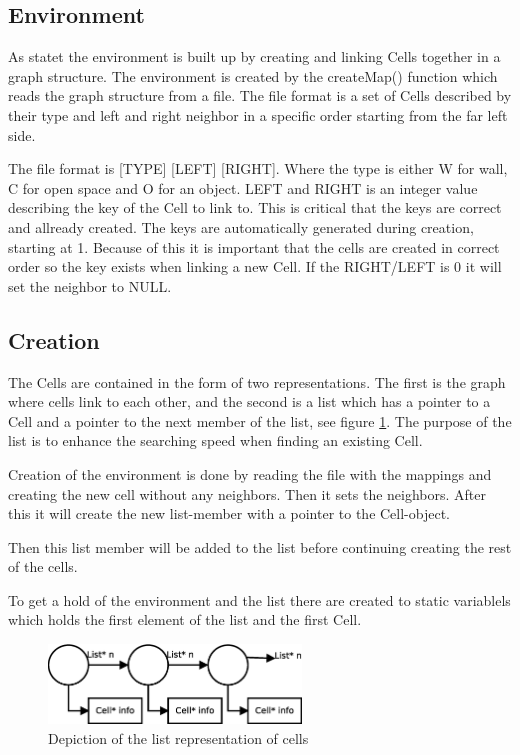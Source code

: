 \subsection{Environment}

As statet the environment is built up by creating and linking Cells together in
a graph structure. The environment is created by the createMap() function which
reads the graph structure from a file.  The file format is a set of Cells
described by their type and left and right neighbor in a specific order starting
from the far left side.

The file format is [TYPE] [LEFT] [RIGHT]. Where the type is either W for wall, C
for open space and O for an object. LEFT and RIGHT is an integer value
describing the key of the Cell to link to.  This is critical that the keys are
correct and allready created.  The keys are automatically generated during
creation, starting at 1.  Because of this it is important that the cells are
created in correct order so the key exists when linking a new Cell.  If the
RIGHT/LEFT is 0 it will set the neighbor to NULL.

\subsection{Creation}
The Cells are contained in the form of two representations.  The first is the
graph where cells link to each other, and the second is a list which has a
pointer to a Cell and a pointer to the next member of the list, see figure
\ref{fig:list}. The purpose of the list is to enhance the searching speed when 
finding an existing Cell.

Creation of the environment is done by reading the file with the mappings and
creating the new cell without any neighbors. Then it sets the neighbors. After
this it will create the new list-member with a pointer to the Cell-object.

Then this list member will be added to the list before continuing creating the
rest of the cells.

To get a hold of the environment and the list there are created to static
variablels which holds the first element of the list and the first Cell.

\begin{figure}[h] \label{fig:list}	\centering
\includegraphics[width=0.6\textwidth]{list}
\caption{Depiction of the list representation of cells}
\end{figure}


